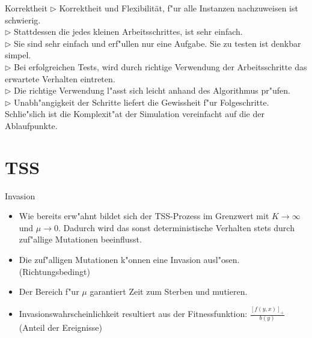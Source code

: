 \documentclass{beamer}
\begin{document}
\begin{frame}{Korrektheit}
$ \rhd $ Korrektheit und Flexibilität, f"ur alle Instanzen nachzuweisen ist schwierig.\smallskip\\\pause
$ \rhd $ Stattdessen die jedes kleinen Arbeitsschrittes, ist sehr einfach.\smallskip\\\pause
$ \rhd $ Sie sind sehr einfach und erf"ullen nur eine Aufgabe. Sie zu testen ist denkbar simpel.\smallskip\\\pause
$ \rhd $ Bei erfolgreichen Tests, wird durch richtige Verwendung der Arbeitsschritte das erwartete Verhalten eintreten.\smallskip\\\pause
$ \rhd $ Die richtige Verwendung l"asst sich leicht anhand des Algorithmus pr"ufen.\smallskip\\\pause
$ \rhd $ Unabh"angigkeit der Schritte liefert die Gewissheit f"ur Folgeschritte. \smallskip\\\pause
Schlie"slich ist die Komplexit"at der Simulation vereinfacht auf die der Ablaufpunkte.
\end{frame}

\section{TSS}
\begin{frame}{Invasion}
	\begin{itemize}
		\item Wie bereits erw"ahnt bildet sich der TSS-Prozess im Grenzwert mit $ K\to \infty $ und $ \mu \to 0 $. Dadurch wird das sonst deterministische Verhalten stets durch zuf"allige Mutationen beeinflusst.
		\item Die zuf"alligen Mutationen k"onnen eine Invasion ausl"osen. (Richtungsbedingt)
		\item Der Bereich f"ur $ \mu $ garantiert Zeit zum Sterben und mutieren.
		\item Invasionswahrscheinlichkeit resultiert aus der Fitnessfunktion: $ \frac{\left[ f(y,x)\right]_+ }{b(y)} $ (Anteil der Ereignisse)
	\end{itemize}
\end{frame}
\end{document}
